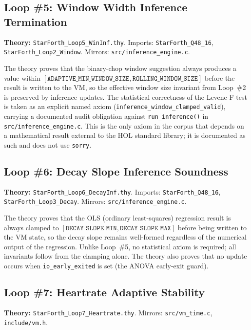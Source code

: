 \subsection{Loop \#5: Window Width Inference Termination}

\textbf{Theory:} \texttt{StarForth\_Loop5\_WinInf.thy}.
Imports: \texttt{StarForth\_Q48\_16}, \texttt{StarForth\_Loop2\_Window}.
Mirrors: \texttt{src/inference\_engine.c}.

The theory proves that the binary-chop window suggestion always produces a
value within $[\texttt{ADAPTIVE\_MIN\_WINDOW\_SIZE}, \texttt{ROLLING\_WINDOW\_SIZE}]$
before the result is written to the VM, so the effective window size invariant
from Loop~\#2 is preserved by inference updates. The statistical correctness
of the Levene F-test is taken as an explicit named axiom
(\texttt{inference\_window\_clamped\_valid}), carrying a documented audit
obligation against \texttt{run\_inference()} in \texttt{src/inference\_engine.c}.
This is the only axiom in the corpus that depends on a mathematical result
external to the HOL standard library; it is documented as such and does not
use \texttt{sorry}.

\subsection{Loop \#6: Decay Slope Inference Soundness}

\textbf{Theory:} \texttt{StarForth\_Loop6\_DecayInf.thy}.
Imports: \texttt{StarForth\_Q48\_16}, \texttt{StarForth\_Loop3\_Decay}.
Mirrors: \texttt{src/inference\_engine.c}.

The theory proves that the OLS (ordinary least-squares) regression result is
always clamped to $[\texttt{DECAY\_SLOPE\_MIN}, \texttt{DECAY\_SLOPE\_MAX}]$
before being written to the VM state, so the decay slope remains well-formed
regardless of the numerical output of the regression. Unlike Loop~\#5, no
statistical axiom is required; all invariants follow from the clamping alone.
The theory also proves that no update occurs when \texttt{io\_early\_exited}
is set (the ANOVA early-exit guard).

\subsection{Loop \#7: Heartrate Adaptive Stability}

\textbf{Theory:} \texttt{StarForth\_Loop7\_Heartrate.thy}.
Mirrors: \texttt{src/vm\_time.c}, \texttt{include/vm.h}.

